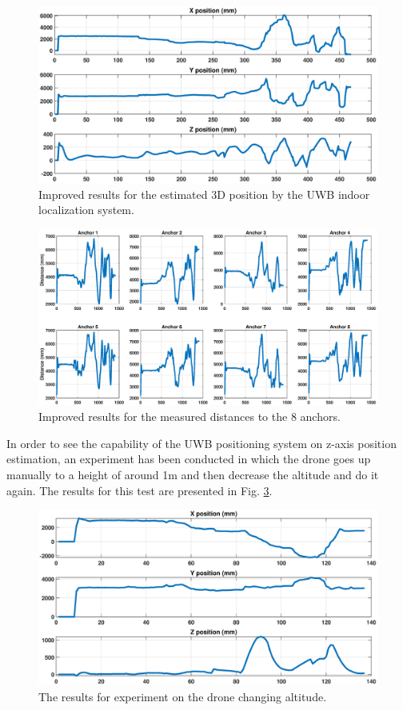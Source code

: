 \documentclass{article}
\begin{document}
\begin{figure}[thpb]
\centering
\includegraphics[scale=0.35]{Pics/UWB_Pos_20May_03.eps}
\caption{Improved results for the estimated 3D position by the UWB indoor localization system.}
\label{Fig_KF_01}
\end{figure}


\begin{figure}[thpb]
\centering
\includegraphics[scale=0.35]{Pics/UWB_Dist_20May_03.eps}
\caption{Improved results for the measured distances to the 8 anchors.}
\label{Fig_KF_02}
\end{figure}

\newpage
In order to see the capability of the UWB positioning system on z-axis position estimation, an experiment has been conducted in which the drone goes up manually to a height of around 1m and then decrease the altitude and do it again. The results for this test are presented in Fig. \ref{Fig_KF_03}.

\begin{figure}[thpb]
\centering
\includegraphics[scale=0.35]{Pics/UWB_Pos_21May_02.eps}
\caption{The results for experiment on the drone changing altitude.}
\label{Fig_KF_03}
\end{figure}
\end{document}
